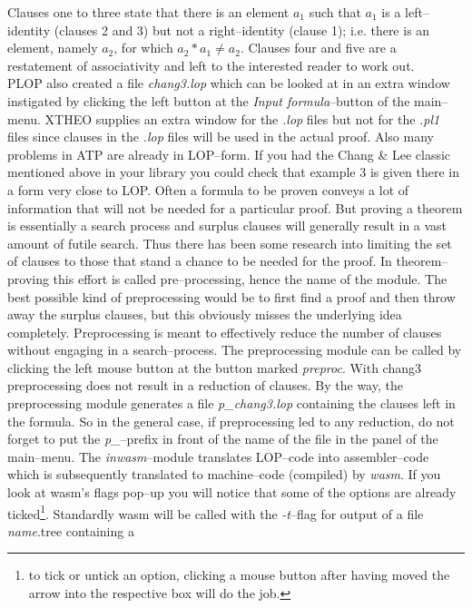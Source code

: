 Clauses one to three state that there is an element $a_1$ such that $a_1$ is a left--identity (clauses 2 and 3)
but not a right--identity (clause 1); i.e. there is an element, namely $a_2$, for which $a_2 * a_1 \neq a_2$.
Clauses four and five are a restatement of associativity and left to the interested reader to work out.
\\
PLOP also created a file {\it chang3.lop\/} which can be looked at in an extra window instigated by
clicking the left button at the {\it Input formula\/}--button of the main--menu.
XTHEO supplies an extra window for the {\it .lop\/} files but not for the {\it .pl1\/} files since
clauses in the {\it .lop\/} files will be used in the actual proof. Also
many problems in ATP are already in LOP--form. If you had the Chang \& Lee classic mentioned above in your library
you could check that example 3 is given there in a form very close to LOP.
Often a formula to be proven conveys a lot of information that will not be needed for a
particular proof. But proving a theorem is essentially a search process and surplus clauses
will generally result in a vast amount of futile search. Thus there has been some research 
into limiting the set of clauses to those that stand a chance to be needed for the proof.
In theorem--proving this effort is called pre--processing, hence the name of the module.
The best possible kind of preprocessing would be to first find a proof and then throw away
the surplus clauses, but this obviously misses the underlying idea completely. Preprocessing
is meant to effectively reduce the number of clauses without engaging in a search--process.
The preprocessing module can be called by clicking the left mouse button at the button marked
{\it preproc\/}. With chang3 preprocessing does not result in a reduction of clauses.
By the way, the preprocessing module generates a file {\it p\_chang3.lop\/} containing the clauses left
in the formula. So in the general case, if preprocessing led to any reduction, do not forget
to put the {\it p\_\/}--prefix in front of the name of the file in the panel of the main--menu.
The {\it inwasm\/}--module translates LOP--code into assembler--code which is subsequently translated
to machine--code (compiled) by {\it wasm\/}.
If you look at wasm's flags pop--up you will notice that some of the options are already ticked\footnote
{to tick or untick an option, clicking a mouse button after having moved the arrow into
the respective box will do the job.}.
Standardly wasm will be called with the {\it -t\/}--flag for output of a file {\it name\/}.tree containing a
